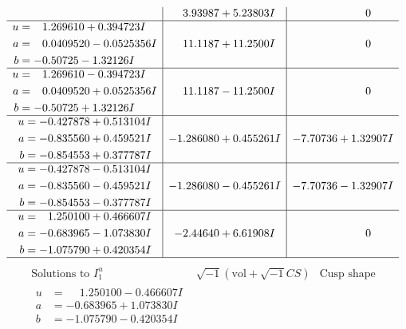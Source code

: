 \documentclass[1p]{elsarticle_modified}
\theoremstyle{definition}
\newcommand{\I}{\sqrt{-1}}
\begin{document}
$$\begin{array}{c|c|c}
 & \phantom{-}3.93987 + 5.23803 I & \phantom{-0.000000 } 0 \\ \hline\begin{aligned}
u &= \phantom{-}1.269610 + 0.394723 I \\
a &= \phantom{-}0.0409520 - 0.0525356 I \\
b &= -0.50725 - 1.32126 I\end{aligned}
 & \phantom{-}11.1187 + 11.2500 I & \phantom{-0.000000 } 0 \\ \hline\begin{aligned}
u &= \phantom{-}1.269610 - 0.394723 I \\
a &= \phantom{-}0.0409520 + 0.0525356 I \\
b &= -0.50725 + 1.32126 I\end{aligned}
 & \phantom{-}11.1187 - 11.2500 I & \phantom{-0.000000 } 0 \\ \hline\begin{aligned}
u &= -0.427878 + 0.513104 I \\
a &= -0.835560 + 0.459521 I \\
b &= -0.854553 + 0.377787 I\end{aligned}
 & -1.286080 + 0.455261 I & -7.70736 + 1.32907 I \\ \hline\begin{aligned}
u &= -0.427878 - 0.513104 I \\
a &= -0.835560 - 0.459521 I \\
b &= -0.854553 - 0.377787 I\end{aligned}
 & -1.286080 - 0.455261 I & -7.70736 - 1.32907 I \\ \hline\begin{aligned}
u &= \phantom{-}1.250100 + 0.466607 I \\
a &= -0.683965 - 1.073830 I \\
b &= -1.075790 + 0.420354 I\end{aligned}
 & -2.44640 + 6.61908 I & \phantom{-0.000000 } 0\\
 \hline 
 \end{array}$$\newpage$$\begin{array}{c|c|c}  
\text{Solutions to }I^u_{1}& \I (\text{vol} + \sqrt{-1}CS) & \text{Cusp shape}\\
 \hline 
\begin{aligned}
u &= \phantom{-}1.250100 - 0.466607 I \\
a &= -0.683965 + 1.073830 I \\
b &= -1.075790 - 0.420354 I\end{aligned}

\end{array}$$
\end{document}
